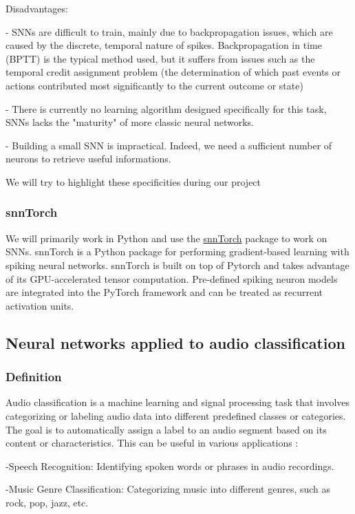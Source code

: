 \documentclass[11pt]{article}
\begin{document}
Disadvantages:

- SNNs are difficult to train, mainly due to backpropagation issues, which are caused by the discrete, temporal nature of spikes. Backpropagation in time (BPTT) is the typical method used, but it suffers from issues such as the temporal credit assignment problem (the determination of which past events or actions contributed most significantly to the current outcome or state)

- There is currently no learning algorithm designed specifically for this task, SNNs lacks the "maturity" of more classic neural networks.

- Building a small SNN is impractical. Indeed, we need a sufficient number of neurons to retrieve useful informations.

We will try to highlight these specificities during our project

\subsubsection{snnTorch}
We will primarily work in Python and use the \hyperref[item:snntorch-lib]{snnTorch} package to work on SNNs. snnTorch is a Python package for performing gradient-based learning with spiking neural networks. snnTorch is built on top of Pytorch and takes advantage of its GPU-accelerated tensor computation. Pre-defined spiking neuron models are integrated into the PyTorch framework and can be treated as recurrent activation units.


\subsection{Neural networks applied to audio classification}
\subsubsection{Definition}
Audio classification is a machine learning and signal processing task that involves categorizing or labeling audio data into different predefined classes or categories. The goal is to automatically assign a label to an audio segment based on its content or characteristics. This can be useful in various applications :

-Speech Recognition: Identifying spoken words or phrases in audio recordings.

-Music Genre Classification: Categorizing music into different genres, such as rock, pop, jazz, etc.
\end{document}
